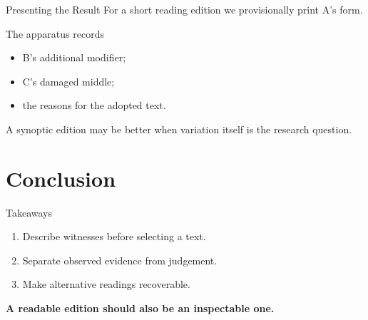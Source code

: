 \documentclass{impebeamer}
\begin{document}
\begin{frame}{Presenting the Result}
  For a short reading edition we provisionally print A's form.
  \begin{block}{The apparatus records}
    \begin{itemize}
      \item B's additional modifier;
      \item C's damaged middle;
      \item the reasons for the adopted text.
    \end{itemize}
  \end{block}
  A synoptic edition may be better when variation
  itself is the research question.
\end{frame}

\section{Conclusion}
\begin{frame}{Takeaways}
  \begin{enumerate}
    \item Describe witnesses before selecting a text.
    \item Separate observed evidence from judgement.
    \item Make alternative readings recoverable.
  \end{enumerate}
  \medskip
  \centering
  \textbf{A readable edition should also be an inspectable one.}
\end{frame}
\end{document}
